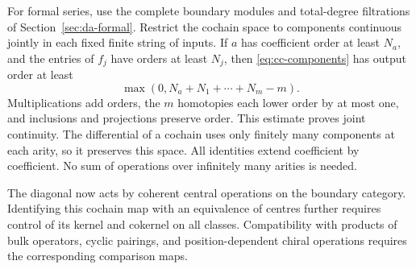 For formal series, use the complete boundary modules and
total-degree filtrations of Section~\ref{sec:da-formal}.
Restrict the cochain space to components continuous jointly
in each fixed finite string of inputs.
If \(a\) has coefficient order at least \(N_a\), and the
entries of \(f_j\) have orders at least \(N_j\), then
\eqref{eq:cc-components} has output order at least
\[
 \max(0,N_a+N_1+\cdots+N_m-m).
\]
Multiplications add orders, the \(m\) homotopies each lower
order by at most one, and inclusions and projections preserve
order. This estimate proves joint continuity.
The differential of a cochain uses only finitely many
components at each arity, so it preserves this space.
All identities extend coefficient by coefficient.
No sum of operations over infinitely many arities is needed.

The diagonal now acts by coherent central operations on the
boundary category. Identifying this cochain map with an
equivalence of centres further requires control of its kernel
and cokernel on all classes. Compatibility with products of
bulk operators, cyclic pairings, and position-dependent chiral
operations requires the corresponding comparison maps.
